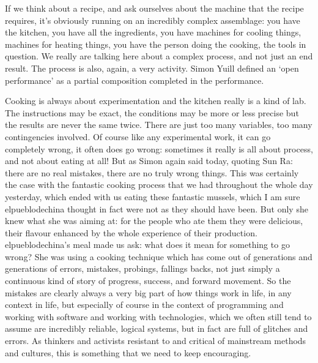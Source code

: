 {If we think about a recipe, and ask ourselves about the machine that the
recipe requires, it's obviously running on an incredibly complex
assemblage: you have the kitchen, you have all the ingredients, you
have machines for cooling things, machines for heating things, you have
the person doing the cooking, the tools in question. We really are
talking here about a complex process, and not just an end result. The
process is also, again, a very  activity. Simon Yuill defined an
`open performance' as a partial composition completed in the
performance. 

Cooking is always about experimentation and the kitchen really is a kind
of lab. The instructions may be exact, the conditions may be more or
less precise but the results are never the same twice. There are just
too many variables, too many contingencies involved. Of course like any
experimental work, it can go completely wrong, it often does go wrong:
sometimes it really is all about process, and not about eating at all!
But as Simon again said today, quoting Sun Ra: there are no real
mistakes, there are no truly wrong things. This was certainly the case
with the fantastic cooking process that we had throughout the whole day
yesterday, which ended with us eating these fantastic mussels, which I
am sure elpueblodechina thought in fact were not as they should have
been. But only she knew what she was aiming at: for the people who ate
them they were delicious, their flavour enhanced by the whole
experience of their production. elpueblodechina's meal made us ask:
what does it mean for something to go wrong? She was using a cooking
technique which has come out of generations and generations of errors,
mistakes, probings, fallings backs, not just simply a continuous kind
of story of progress, success, and forward movement. So the mistakes
are clearly always a very big part of how things work in life, in any
context in life, but especially of course in the context of programming
and working with software and working with technologies, which we often
still tend to assume are incredibly reliable, logical systems, but in
fact are full of glitches and errors. As thinkers and activists
resistant to and critical of mainstream methods and cultures, this is
something that we need to keep encouraging. 

}
